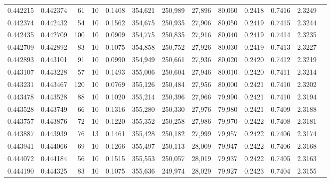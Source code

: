 \begin{tabular}{rrrrrrrrrrrrr}
0.442215 & 0.442374 &    61 &  10 &                                     0.1408 & 354,621 & 250,989 &  27,896 &  80,060 & 0.2418 & 0.7416 & 2.3249 \\
0.442374 & 0.442432 &    54 &  10 &                                     0.1562 & 354,675 & 250,935 &  27,906 &  80,050 & 0.2419 & 0.7415 & 2.3244 \\
0.442435 & 0.442709 &   100 &  10 &                                     0.0909 & 354,775 & 250,835 &  27,916 &  80,040 & 0.2419 & 0.7414 & 2.3235 \\
0.442709 & 0.442892 &    83 &  10 &                                     0.1075 & 354,858 & 250,752 &  27,926 &  80,030 & 0.2419 & 0.7413 & 2.3227 \\
0.442893 & 0.443101 &    91 &  10 &                                     0.0990 & 354,949 & 250,661 &  27,936 &  80,020 & 0.2420 & 0.7412 & 2.3219 \\
0.443107 & 0.443228 &    57 &  10 &                                     0.1493 & 355,006 & 250,604 &  27,946 &  80,010 & 0.2420 & 0.7411 & 2.3214 \\
0.443231 & 0.443467 &   120 &  10 &                                     0.0769 & 355,126 & 250,484 &  27,956 &  80,000 & 0.2421 & 0.7410 & 2.3202 \\
0.443478 & 0.443528 &    88 &  10 &                                     0.1020 & 355,214 & 250,396 &  27,966 &  79,990 & 0.2421 & 0.7410 & 2.3194 \\
0.443528 & 0.443749 &    66 &  10 &                                     0.1316 & 355,280 & 250,330 &  27,976 &  79,980 & 0.2421 & 0.7409 & 2.3188 \\
0.443757 & 0.443876 &    72 &  10 &                                     0.1220 & 355,352 & 250,258 &  27,986 &  79,970 & 0.2422 & 0.7408 & 2.3181 \\
0.443887 & 0.443939 &    76 &  13 &                                     0.1461 & 355,428 & 250,182 &  27,999 &  79,957 & 0.2422 & 0.7406 & 2.3174 \\
0.443941 & 0.444066 &    69 &  10 &                                     0.1266 & 355,497 & 250,113 &  28,009 &  79,947 & 0.2422 & 0.7406 & 2.3168 \\
0.444072 & 0.444184 &    56 &  10 &                                     0.1515 & 355,553 & 250,057 &  28,019 &  79,937 & 0.2422 & 0.7405 & 2.3163 \\
0.444190 & 0.444325 &    83 &  10 &                                     0.1075 & 355,636 & 249,974 &  28,029 &  79,927 & 0.2423 & 0.7404 & 2.3155 \\

\end{tabular}
